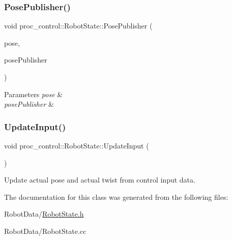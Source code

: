 \subsubsection{\texorpdfstring{Pose\+Publisher()}{PosePublisher()}}
{\footnotesize\ttfamily void proc\+\_\+control\+::\+Robot\+State\+::\+Pose\+Publisher (\begin{DoxyParamCaption}\item[{const Eigen\+::\+Vector\+Xd \&}]{pose,  }\item[{ros\+::\+Publisher \&}]{pose\+Publisher }\end{DoxyParamCaption})}


\begin{DoxyParams}{Parameters}
{\em pose} & \\
\hline
{\em pose\+Publisher} & \\
\hline
\end{DoxyParams}
\mbox{\label{classproc__control_1_1_robot_state_a8ab9a29a8c662c5ba536b592223cd299}} 
\subsubsection{\texorpdfstring{Update\+Input()}{UpdateInput()}}
{\footnotesize\ttfamily void proc\+\_\+control\+::\+Robot\+State\+::\+Update\+Input (\begin{DoxyParamCaption}{ }\end{DoxyParamCaption})}

Update actual pose and actual twist from control input data. 

The documentation for this class was generated from the following files\+:\begin{DoxyCompactItemize}
\item 
Robot\+Data/\hyperlink{_robot_state_8h}{Robot\+State.\+h}\item 
Robot\+Data/Robot\+State.\+cc\end{DoxyCompactItemize}
